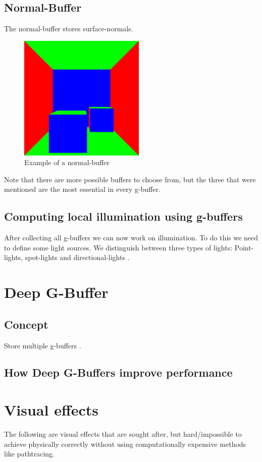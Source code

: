 \documentclass{ACGSeminar}
\begin{document}
	\subsection{Normal-Buffer}
		The normal-buffer stores surface-normals.
		\begin{figure}[htb!]%
			\begin{center}%
				\includegraphics[width=6cm]{img/normal_buffer.png}
			\end{center}%
			\caption{Example of a normal-buffer}%
			\label{fig:normal_buffer}%
		\end{figure}%
		Note that there are more possible buffers to choose from, but the three that were mentioned are the most essential in every g-buffer.
	\subsection{Computing local illumination using g-buffers}
		After collecting all g-buffers we can now work on illumination. To do this we need to define some light sources. We distinguish between three types of lights:
		Point-lights, spot-lights and directional-lights \cite{DST}.

\section{Deep G-Buffer}
	\subsection{Concept}
	Store multiple g-buffers \cite{NDGB}.
	\subsection{How Deep G-Buffers improve performance}

\section{Visual effects}
	The following are visual effects that are sought after, but hard/impossible to achieve physically correctly without using
	computationally expensive methods like pathtracing. 
\end{document}
